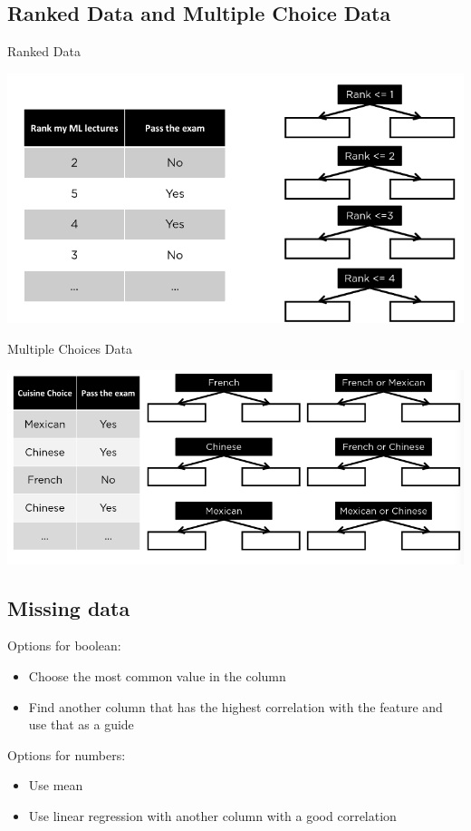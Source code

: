 \documentclass{article}[18pt]
\begin{document}
\subsection{Ranked Data and Multiple Choice Data}
Ranked Data
\begin{center}
	\includegraphics[scale=0.7]{"Ranked Data"}
\end{center}
Multiple Choices Data
\begin{center}
	\includegraphics[scale=0.7]{"Multiple Choices Data"}
\end{center}
\subsection{Missing data}
Options for boolean:
\begin{itemize}
	\item Choose the most common value in the column
	\item Find another column that has the highest correlation with the feature and use that as a guide
\end{itemize}
Options for numbers:
\begin{itemize}
	\item Use mean
	\item Use linear regression with another column with a good correlation
\end{itemize}
\end{document}
